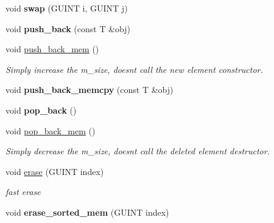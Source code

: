 \begin{DoxyCompactItemize}
void {\bfseries swap} (G\+U\+I\+NT i, G\+U\+I\+NT j)
\item 
\mbox{\label{classgim__array_a45b9c313cf887ed8a2fd6d1895b2c309}} 
void {\bfseries push\+\_\+back} (const T \&obj)
\item 
\mbox{\label{classgim__array_acbd3ad9a6756d0b91e42549a0e7107f0}} 
void \hyperlink{classgim__array_acbd3ad9a6756d0b91e42549a0e7107f0}{push\+\_\+back\+\_\+mem} ()
\begin{DoxyCompactList}\small\item\em Simply increase the m\+\_\+size, doesn\textquotesingle{}t call the new element constructor. \end{DoxyCompactList}\item 
\mbox{\label{classgim__array_a8ef553253e1a77ed4f3168ca2e4da225}} 
void {\bfseries push\+\_\+back\+\_\+memcpy} (const T \&obj)
\item 
\mbox{\label{classgim__array_aeebbf5deb27265451bf00db5ce57c5fc}} 
void {\bfseries pop\+\_\+back} ()
\item 
\mbox{\label{classgim__array_aa15906909f6f824e559864359096db63}} 
void \hyperlink{classgim__array_aa15906909f6f824e559864359096db63}{pop\+\_\+back\+\_\+mem} ()
\begin{DoxyCompactList}\small\item\em Simply decrease the m\+\_\+size, doesn\textquotesingle{}t call the deleted element destructor. \end{DoxyCompactList}\item 
\mbox{\label{classgim__array_a0de98d5b161c18568c7bc3a13e90df51}} 
void \hyperlink{classgim__array_a0de98d5b161c18568c7bc3a13e90df51}{erase} (G\+U\+I\+NT index)
\begin{DoxyCompactList}\small\item\em fast erase \end{DoxyCompactList}\item 
\mbox{\label{classgim__array_a878dddc1e188bfdbd738ec925f4386cf}} 
void {\bfseries erase\+\_\+sorted\+\_\+mem} (G\+U\+I\+NT index)
\item 
\mbox{\label{classgim__array_a992f8d76ef464690cd11a4ffc3d5ac2d}} 

\end{DoxyCompactItemize}
